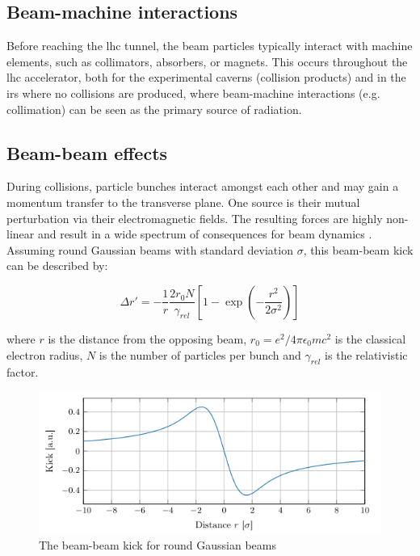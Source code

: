 \documentclass[encoding=utf8,british]{tumphthesis}
\begin{document}
\subsection{Beam-machine interactions}
Before reaching the \acrshort{lhc} tunnel, the beam particles typically interact with machine elements, such as collimators, absorbers, or magnets. This occurs throughout the \acrshort{lhc} accelerator, both for the experimental caverns (collision products) and in the \acrshort{ir}s where no collisions are produced, where beam-machine interactions (e.g. collimation) can be seen as the primary source of radiation.



\subsection{Beam-beam effects}

During collisions, particle bunches interact amongst each other and may gain a momentum transfer to the transverse plane. One source is their mutual perturbation via their electromagnetic fields. The resulting forces are highly non-linear and result in a wide spectrum of consequences for beam dynamics \cite{Herr:1982430}. Assuming round Gaussian beams with standard deviation $\sigma$, this beam-beam kick can be described by:

\begin{equation}
    \Delta r' = - \frac{1}{r} \frac{2 r_0 N}{\gamma_{rel}}  \left[ 1- \exp{\left( - \frac{r^2}{2 \sigma^2}\right)} \right]
\end{equation}

where $r$ is the distance from the opposing beam, $r_0=e^2/4\pi \epsilon_0 m c^2$ is the classical electron radius, $N$ is the number of particles per bunch and $\gamma_{rel}$ is the relativistic factor.

\begin{figure}[H]
    \centering
    \includegraphics[width=0.8\linewidth]{figures/beam-beam-kick.png}
    \caption{The beam-beam kick for round Gaussian beams \cite{Hostettler:2319396}}
    \label{fig:beam-kick}
\end{figure}
\end{document}
